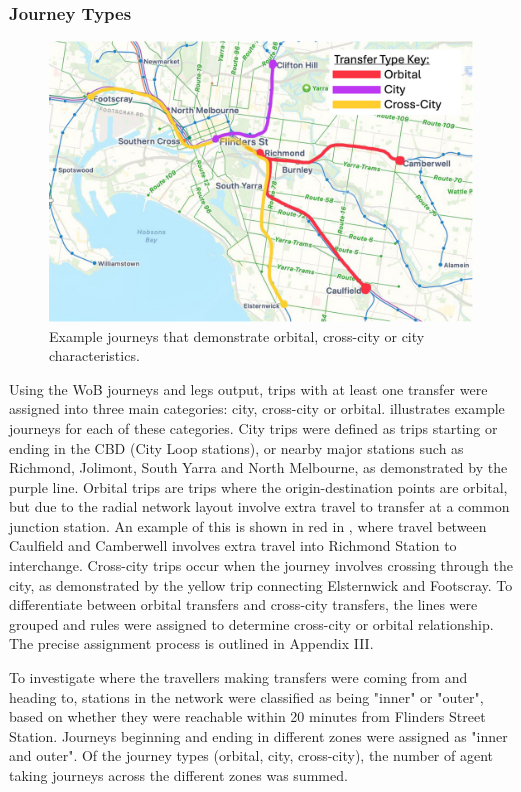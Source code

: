 \subsubsection{Journey Types}
\begin{figure}[ht]
    \centering
    \includegraphics[width=0.75\linewidth]{images/Case_Study/diagram_assigning_groups_transfers.PNG}
    \caption{Example journeys that demonstrate orbital, cross-city or city characteristics. }
    \label{fig:transfer-diagram}
\end{figure}
Using the WoB journeys and legs output, trips with at least one transfer were assigned into three main categories: city, cross-city or orbital.  illustrates example journeys for each of these categories. City trips were defined as trips starting or ending in the CBD (City Loop stations), or nearby major stations such as Richmond, Jolimont, South Yarra and North Melbourne, as demonstrated by the purple line. Orbital trips are trips where the origin-destination points are orbital, but due to the radial network layout involve extra travel to transfer at a common junction station. An example of this is shown in red in , where travel between Caulfield and Camberwell involves extra travel into Richmond Station to interchange. Cross-city trips occur when the journey involves crossing through the city, as demonstrated by the yellow trip connecting Elsternwick and Footscray. To differentiate between orbital transfers and cross-city transfers, the lines were grouped and rules were assigned to determine cross-city or orbital relationship. The precise assignment process is outlined in Appendix III.

To investigate where the travellers making transfers were coming from and heading to, stations in the network were classified as being "inner" or "outer", based on whether they were reachable within 20 minutes from Flinders Street Station. Journeys beginning and ending in different zones were assigned as "inner and outer". Of the journey types (orbital, city, cross-city), the number of agent taking journeys across the different zones was summed. 

